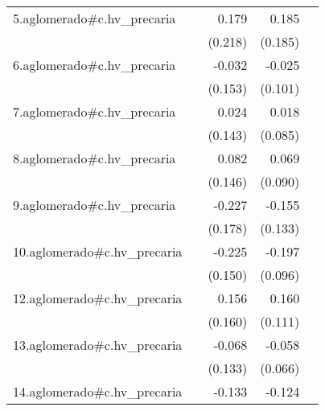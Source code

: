 {\begin{longtable}{l*{4}{D{.}{.}{-1}}}
\addlinespace
5.aglomerado#c.hv\_precaria&                     &       0.179         &       0.185         &                     \\
            &                     &     (0.218)         &     (0.185)         &                     \\
\addlinespace
6.aglomerado#c.hv\_precaria&                     &      -0.032         &      -0.025         &                     \\
            &                     &     (0.153)         &     (0.101)         &                     \\
\addlinespace
7.aglomerado#c.hv\_precaria&                     &       0.024         &       0.018         &                     \\
            &                     &     (0.143)         &     (0.085)         &                     \\
\addlinespace
8.aglomerado#c.hv\_precaria&                     &       0.082         &       0.069         &                     \\
            &                     &     (0.146)         &     (0.090)         &                     \\
\addlinespace
9.aglomerado#c.hv\_precaria&                     &      -0.227         &      -0.155         &                     \\
            &                     &     (0.178)         &     (0.133)         &                     \\
\addlinespace
10.aglomerado#c.hv\_precaria&                     &      -0.225         &      -0.197\sym{*}  &                     \\
            &                     &     (0.150)         &     (0.096)         &                     \\
\addlinespace
12.aglomerado#c.hv\_precaria&                     &       0.156         &       0.160         &                     \\
            &                     &     (0.160)         &     (0.111)         &                     \\
\addlinespace
13.aglomerado#c.hv\_precaria&                     &      -0.068         &      -0.058         &                     \\
            &                     &     (0.133)         &     (0.066)         &                     \\
\addlinespace
14.aglomerado#c.hv\_precaria&                     &      -0.133         &      -0.124         &                     \\

\end{longtable}}
